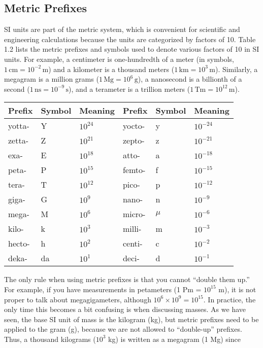 \documentclass{report}
\begin{document}
    \subsection{Metric Prefixes}
    \bigbreak \noindent 
    SI units are part of the metric system, which is convenient for scientific and engineering calculations because the units are categorized by factors of 10. Table 1.2 lists the metric prefixes and symbols used to denote various factors of 10 in SI units. For example, a centimeter is one-hundredth of a meter (in symbols, \(1 \, \text{cm} = 10^{-2} \, \text{m}\)) and a kilometer is a thousand meters (\(1 \, \text{km} = 10^{3} \, \text{m}\)). Similarly, a megagram is a million grams (\(1 \, \text{Mg} = 10^{6} \, \text{g}\)), a nanosecond is a billionth of a second (\(1 \, \text{ns} = 10^{-9} \, \text{s}\)), and a terameter is a trillion meters (\(1 \, \text{Tm} = 10^{12} \, \text{m}\)).
    \bigbreak \noindent 
    \begin{center}
        \begin{tabular}{@{}llllll@{}}
            \toprule
            Prefix & Symbol & Meaning & Prefix & Symbol & Meaning \\ 
            \midrule
            yotta- & Y & $10^{24}$ & yocto- & y & $10^{-24}$ \\
            zetta- & Z & $10^{21}$ & zepto- & z & $10^{-21}$ \\
            exa-   & E & $10^{18}$ & atto-  & a & $10^{-18}$ \\
            peta-  & P & $10^{15}$ & femto- & f & $10^{-15}$ \\
            tera-  & T & $10^{12}$ & pico-  & p & $10^{-12}$ \\
            giga-  & G & $10^9$   & nano-  & n & $10^{-9}$  \\
            mega-  & M & $10^6$   & micro- & $\mu$ & $10^{-6}$ \\
            kilo-  & k & $10^3$   & milli- & m & $10^{-3}$ \\
            hecto- & h & $10^2$   & centi- & c & $10^{-2}$ \\
            deka-  & da & $10^1$  & deci-  & d & $10^{-1}$ \\
            \bottomrule
        \end{tabular}
    \end{center}
    \bigbreak \noindent 
    The only rule when using metric prefixes is that you cannot ``double them up.'' For example, if you have measurements in petameters (1 Pm = $10^{15}$ m), it is not proper to talk about megagigameters, although $10^6 \times 10^9 = 10^{15}$. In practice, the only time this becomes a bit confusing is when discussing masses. As we have seen, the base SI unit of mass is the kilogram (kg), but metric prefixes need to be applied to the gram (g), because we are not allowed to ``double-up'' prefixes. Thus, a thousand kilograms ($10^3$ kg) is written as a megagram (1 Mg) since
\end{document}
